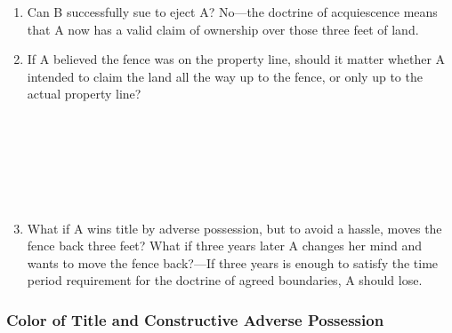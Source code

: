 \begin{enumerate}
\begin{enumerate}
        \item Can B successfully sue to eject A? No---the doctrine of 
        acquiescence means that A now has a valid claim of ownership over 
        those three feet of land.
        \item If A believed the fence was on the property line, should it 
        matter whether A intended to claim the land all the way up to the 
        fence, or only up to the actual property line?
        ~\\\\\\\\\\\\\\%
        \item What if A wins title by adverse possession, but to avoid a 
        hassle, moves the fence back three feet? What if three years later A 
        changes her mind and wants to move the fence back?---If three years is 
        enough to satisfy the time period requirement for the doctrine of 
        agreed boundaries, A should lose.
    \end{enumerate}
\end{enumerate}

\subsubsection{Color of Title and Constructive Adverse Possession}

